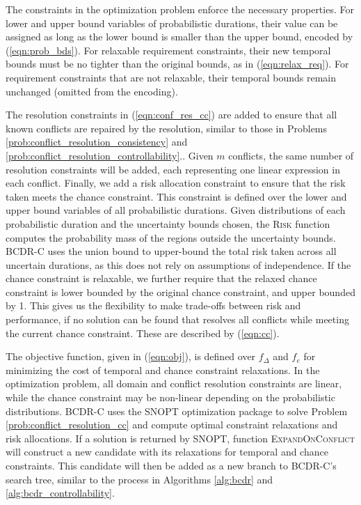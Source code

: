\documentclass[jair,twoside,11pt,theapa]{article}
\begin{document}
The constraints in the optimization problem enforce the necessary properties.
For lower and upper bound variables of probabilistic durations, their value can
be assigned as long as the lower bound is smaller than the upper bound,
encoded by (\ref{eqn:prob_bds}). For relaxable requirement constraints, their new
temporal bounds must be no tighter than the original bounds, as in
(\ref{eqn:relax_req}). For requirement constraints that are not relaxable, their
temporal bounds remain unchanged (omitted from the encoding).


The resolution constraints in (\ref{eqn:conf_res_cc}) are added to ensure that
all known conflicts are repaired by the resolution, similar to those in Problems
\ref{prob:conflict_resolution_consistency} and \ref{prob:conflict_resolution_controllability}.. Given $m$ conflicts, the same number
of resolution constraints will be added, each representing one linear expression
in each conflict. Finally, we add a risk allocation constraint to ensure that
the risk taken meets the chance constraint. This constraint is defined over the
lower and upper bound variables of all probabilistic durations. Given
distributions of each probabilistic duration and the uncertainty bounds chosen,
the \textsc{Risk} function computes the probability mass of the regions outside
the uncertainty bounds. BCDR-C uses the union bound to upper-bound the total
risk taken across all uncertain durations, as this does not rely on assumptions
of independence. If the chance constraint is relaxable, we further require that
the relaxed chance constraint is lower bounded by the original chance
constraint, and upper bounded by 1. This gives us the flexibility to make
trade-offs between risk and performance, if no solution can be found that
resolves all conflicts while meeting the current chance constraint. These are
described by (\ref{eqn:cc}).


The objective function, given in (\ref{eqn:obj}), is defined over $f_\Delta$ and
$f_{e}$ for minimizing the cost of temporal and chance constraint relaxations.
In the optimization problem, all domain and conflict resolution constraints are
linear, while the chance constraint may be non-linear depending on the
probabilistic distributions. BCDR-C uses the SNOPT optimization package
\cite{Wachter06onthe} to solve Problem \ref{prob:conflict_resolution_cc} and
compute optimal constraint relaxations and risk allocations. If a solution is
returned by SNOPT, function \textsc{ExpandOnConflict} will construct a new
candidate with its relaxations for temporal and chance constraints. This
candidate will then be added as a new branch to BCDR-C's search tree, similar to
the process in Algorithms \ref{alg:bcdr} and \ref{alg:bcdr_controllability}. 
\end{document}
